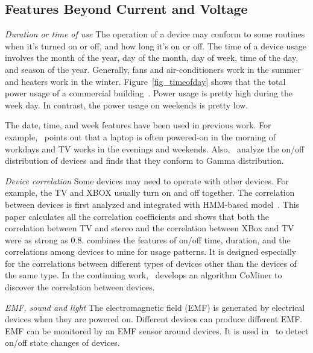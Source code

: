 
\subsection{Features Beyond Current and Voltage}

\textit{Duration or time of use}
The operation of a device may conform to
some routines when it's turned on or off,
and how long it's on or off.
The time of a device usage involves the
month of the year, day of the month, day of week, time of the day,
and season of the year.
Generally, fans and air-conditioners
work in the summer and heaters work in the winter.
Figure~\ref{fig_timeofday} shows that 
the total power usage of a commercial building~\cite{shao2013temporal}.
Power usage is pretty high during the week day. 
In contrast, the power usage on weekends 
is pretty low. 

The date, time, and week features have been used in previous work.
For example,~\cite{kim2011unsupervised} points out that
a laptop is often powered-on in the morning of workdays
and TV works in the evenings and weekends. 
Also,~\cite{kim2011unsupervised} analyze the on/off
distribution of devices and finds that
they conform to Gamma distribution.

\textit{Device correlation}
Some devices may need to operate with other devices.
For example, the TV and XBOX usually turn on and off
together.
The correlation between devices is first
analyzed and integrated with HMM-based model~\cite{kim2011unsupervised}.
This paper calculates all the correlation coefficients and 
shows that 
both the correlation between TV and stereo
and the correlation between XBox and TV were as strong as 0.8.
\cite{chen2013novel} combines the features of on/off time, duration, and the correlations 
among devices to mine for usage patterns. It is designed especially for the correlations between different 
types of devices other than the devices of the same type. 
In the continuing work,~\cite{chen2014mining} develops an algorithm CoMiner to discover the 
correlation between devices. 

\textit{EMF, sound and light}
The electromagnetic field (EMF)
is generated by electrical devices
when they are powered on.
Different devices can produce different EMF.
EMF can be monitored by an EMF sensor around
devices.
It is used in~\cite{giri_study_2012}
to detect on/off state changes of devices.

